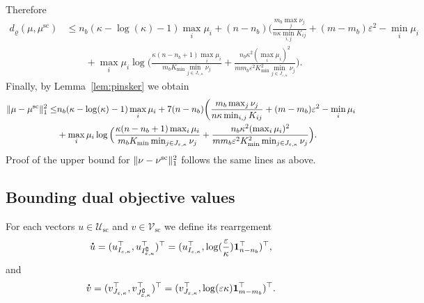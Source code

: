Therefore
\begin{align*}
d_\varrho({\mu},{\mu}^{\text{sc}}) &\leq n_b(\kappa-\log(\kappa)-1)\max_{i} \mu_i + (n-n_b)\bigg(\frac{m_b\max_{j}\nu_j}{n\kappa\min_{i,j} K_{ij}} + (m- m_b) \varepsilon^2 - \min_{i}\mu_i\\
&\qquad + \max_{i} \mu_i\log\Big(\frac{\kappa(n-n_b+ 1)\max_{i} \mu_i}{m_bK_{\min}\min_{j \in J_{\varepsilon,\kappa}}\nu_j} + \frac{n_b\kappa^2(\max_{i} \mu_i)^2}{mm_b\varepsilon^2 K_{\min}^2\min_{j \in J_{\varepsilon,\kappa}}\nu_j}\Big).
\end{align*}
Finally, by Lemma~\ref{lem:pinsker} we obtain
\begin{align*}
\norm{{\mu} -{\mu}^{\text{sc}}}^2_1 \leq & n_b(\kappa-\log(\kappa)-1)\max_{i} \mu_i + 7(n-n_b)\bigg(\frac{m_b\max_{j}\nu_j}{n\kappa\min_{i,j} K_{ij}} + (m- m_b) \varepsilon^2 - \min_{i}\mu_i\\
&+ \max_{i} \mu_i\log\Big(\frac{\kappa(n-n_b+ 1)\max_{i} \mu_i}{m_bK_{\min}\min_{j \in J_{\varepsilon,\kappa}}\nu_j} + \frac{n_b\kappa^2(\max_{i} \mu_i)^2}{mm_b\varepsilon^2K_{\min}^2\min_{j \in J_{\varepsilon,\kappa}}\nu_j}\Big).%
\end{align*}
Proof of the upper bound for $\|\nu - {\nu}^{\text{sc}}\|^2_1$ follows the same lines as above.

\subsection{Bounding dual objective values}

For each vectors $u \in \mathcal{U}_{\text{sc}}$ and $v\in \mathcal{V}_{\text{sc}}$ we define its rearrgement 
\begin{equation*}
\dt{u} =(u_{I_{\varepsilon,\kappa}}^\top, u_{I^\complement_{\varepsilon,\kappa}}^\top)^\top = (u_{I_{\varepsilon,\kappa}}^\top, \log(\frac\varepsilon\kappa)\mathbf1_{n- n_b}^\top)^\top,
\end{equation*}
and 
\begin{equation*}
\dt{v} =(v_{J_{\varepsilon,\kappa}}^\top, v_{J^\complement_{\varepsilon,\kappa}}^\top)^\top = (v_{J_{\varepsilon,\kappa}}^\top, \log(\varepsilon\kappa)\mathbf 1_{m- m_b}^\top)^\top.
\end{equation*}


